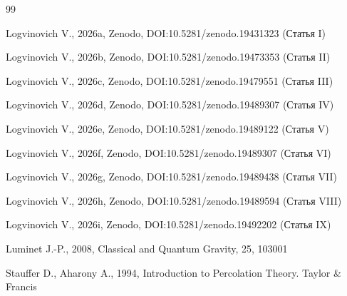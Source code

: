 \documentclass[12pt,a4paper]{article}
\begin{document}
\begin{thebibliography}{99}

Logvinovich V., 2026a, Zenodo, DOI:10.5281/zenodo.19431323 (Статья I)

Logvinovich V., 2026b, Zenodo, DOI:10.5281/zenodo.19473353 (Статья II)

Logvinovich V., 2026c, Zenodo, DOI:10.5281/zenodo.19479551 (Статья III)

Logvinovich V., 2026d, Zenodo, DOI:10.5281/zenodo.19489307 (Статья IV)

Logvinovich V., 2026e, Zenodo, DOI:10.5281/zenodo.19489122 (Статья V)

Logvinovich V., 2026f, Zenodo, DOI:10.5281/zenodo.19489307 (Статья VI)

Logvinovich V., 2026g, Zenodo, DOI:10.5281/zenodo.19489438 (Статья VII)

Logvinovich V., 2026h, Zenodo, DOI:10.5281/zenodo.19489594 (Статья VIII)

Logvinovich V., 2026i, Zenodo, DOI:10.5281/zenodo.19492202 (Статья IX)

Luminet J.-P., 2008, Classical and Quantum Gravity, 25, 103001

Stauffer D., Aharony A., 1994, Introduction to Percolation Theory. Taylor \& Francis

\end{thebibliography}
\end{document}
